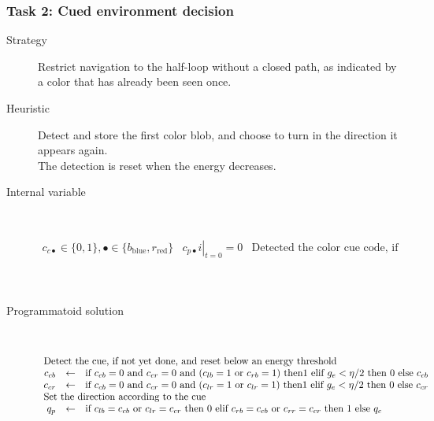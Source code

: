 \documentclass[a4]{article}
\newcommand{\eqline}[1]{~\vspace{0.1cm}\\\centerline{$#1$}\vspace{0.1cm}\\}
\begin{document}
\subsubsection{Task 2: Cued environment decision} \begin{description}
  \item[Strategy] Restrict navigation to the half-loop without a closed path, as indicated by a color that has already been seen once.
  \item[Heuristic] Detect and store the first color blob, and choose to turn in the direction it appears again. \\ The detection is reset when the energy decreases.
    \item[Internal variable] \eqline{\begin{array}{lll}
        c_{c\bullet} \in \{0, 1\} , \bullet \in \{b_{\mbox{blue}}, r_{\mbox{red}}\} & \left. c_{p\bullet} i \right|_{t = 0} = 0 & \mbox{Detected the color cue code, if any.} \\
    \end{array}}
    \item[Programmatoid solution] \eqline{\begin{array}{rcl}
        \multicolumn{3}{l}{\mbox{Detect the cue, if not yet done, and reset below an energy threshold}} \\
        c_{cb} &\leftarrow& \mbox{if }  c_{cb} = 0 \mbox{ and } c_{cr} = 0 \mbox{ and } (c_{lb} = 1 \mbox{ or } c_{rb} = 1) \mbox{ then} 1 \mbox{ elif } g_e < \eta/2 \mbox{ then } 0 \mbox{ else } c_{cb} \\
        c_{cr} &\leftarrow& \mbox{if }  c_{cb} = 0 \mbox{ and } c_{cr} = 0 \mbox{ and } (c_{lr} = 1 \mbox{ or } c_{lr} = 1) \mbox{ then} 1 \mbox{ elif } g_e < \eta/2 \mbox{ then } 0 \mbox{ else }c_{cr} \\
        \multicolumn{3}{l}{\mbox{Set the direction according to the cue}} \\
        q_p &\leftarrow& \mbox{if }  c_{lb} = c_{cb} \mbox{ or }  c_{lr} = c_{cr} \mbox{ then } 0 \mbox{ elif } c_{rb} = c_{cb} \mbox{ or }  c_{rr} = c_{cr} \mbox{ then } 1 \mbox{ else } q_c \\
   \end{array}} \end{description}
\end{document}
